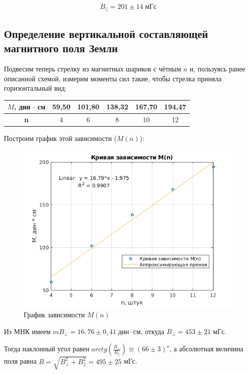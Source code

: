 \begin{equation}
    B_{||} = 201 \pm 14 \; \text{мГс}
\end{equation}

\subsection{Определение вертикальной составляющей магнитного поля Земли}

Подвесим теперь стрелку из магнитных шариков с чётным $n$ и, пользуясь ранее описанной схемой, измерим моменты сил такие, чтобы стрелка приняла горизонтальный вид:

\begin{table}[h!]
    \centering
    \begin{tabular}{|c|c|c|c|c|c|}
    \hline
    \textbf{$M$, дин $\cdot$ см} & 59,50 & 101,80 & 138,32 & 167,70 & 194,47 \\ \hline
    \textbf{n}                   & 4     & 6      & 8      & 10     & 12     \\ \hline
    \end{tabular}
\end{table}

Построим график этой зависимости ($M(n)$):

\begin{figure}[h!]
    \centering
    \includegraphics[width = 10 cm]{images/mn.png}
    \caption{График зависимости $M(n)$}
    \label{mn}
\end{figure}

Из МНК имеем $m B_{\perp} = 16,76 \pm 0,41 \; \text{дин} \cdot \text{см}$, откуда $B_{\perp} = 453 \pm 21$ мГс.

Тогда наклонный угол равен $arctg(\frac{B_{\perp}}{B_{||}}) \cong (66 \pm 3)^{o}$, а абсолютная величина поля равна $B = \sqrt{B_{\perp}^2 + B_{||}^2} = 495 \pm 25$ мГс.

